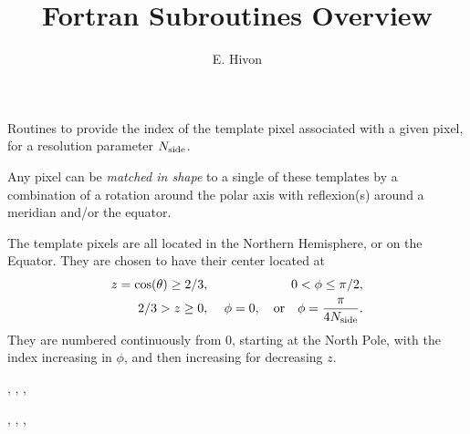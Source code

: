 
\sloppy


\title{\healpix Fortran Subroutines Overview}
\section[template\_pixel\_nest, template\_pixel\_ring]{ }
\label{sub:template_pixel_xxx}
\author{E. Hivon}

\begin{facility}
{Routines to provide the index of the template pixel associated with a given
  \healpix pixel, for a resolution parameter ${N_{\rm side}}$. 

Any pixel can be {\em matched in shape}
  to a single of these templates by a combination of  a rotation around the polar axis with 
  reflexion(s) around a meridian and/or the equator. 

The template pixels are all located in the Northern Hemisphere, or on the
 Equator.
They are chosen to have their center located at
\begin{eqnarray}
     z=\cos(\theta)\ge 2/3,  &\ &    0< \phi \leq \pi/2,   \nonumber\\            %
     2/3 > z \geq 0,  &\ & \phi=0, \quad{\rm or}\quad  \phi=\frac{\pi}{4\nside}.  \nonumber %
\myhtmlimage{}
\end{eqnarray}
 They are numbered continuously from 0, starting at the North Pole, with the index
 increasing in $\phi$, and then increasing for decreasing $z$.
}
{\modPixTools}
\end{facility}

\begin{f90format}
{%
, 
, 
, 
%
}
\end{f90format}
\begin{f90format}
{%
, 
, 
, 
%
}
\end{f90format}

